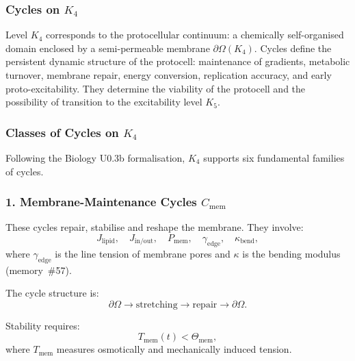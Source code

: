
\subsubsection{Cycles on \texorpdfstring{$K_4$}{K_4}}
\label{sec:cycles-k4}

Level $K_4$ corresponds to the protocellular continuum: 
a chemically self-organised domain enclosed by a semi-permeable
membrane $\partial\Omega(K_4)$.
Cycles define the persistent dynamic structure of the protocell:
maintenance of gradients, metabolic turnover, membrane repair,
energy conversion, replication accuracy, and early proto-excitability.
They determine the viability of the protocell and the possibility
of transition to the excitability level $K_5$.

\subsubsection{Classes of Cycles on \texorpdfstring{$K_4$}{K_4}}

Following the Biology U0.3b formalisation, $K_4$ supports six
fundamental families of cycles.

\subsubsection{1. Membrane-Maintenance Cycles $C_{\mathrm{mem}}$}

These cycles repair, stabilise and reshape the membrane.
They involve:
\[
  J_{\mathrm{lipid}},\quad
  J_{\mathrm{in/out}},\quad
  P_{\mathrm{mem}},\quad
  \gamma_{\mathrm{edge}},\quad
  \kappa_{\mathrm{bend}},
\]
where $\gamma_{\mathrm{edge}}$ is the line tension of membrane pores
and $\kappa$ is the bending modulus (memory~\#57).

The cycle structure is:
\[
  \partial\Omega \to 
  \mathrm{stretching} \to 
  \mathrm{repair} \to 
  \partial\Omega.
\]

Stability requires:
\[
  T_{\mathrm{mem}}(t) < \Theta_{\mathrm{mem}},
\]
where $T_{\mathrm{mem}}$ measures osmotically and mechanically
induced tension.

